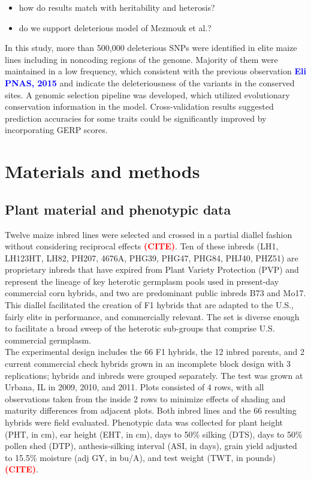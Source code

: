 \documentclass[10pt]{article}
\newcommand{\sme}[1]{\textcolor{red}{\bf #1}}
\newcommand{\yang}[1]{\textcolor{blue}{\bf #1}}
\begin{document}
\begin{itemize}
  \item how do results match with heritability and heterosis?
  \item do we support deleterious model of Mezmouk et al.?
\end{itemize}

In this study, more than 500,000 deleterious SNPs were identified in elite maize lines including in noncoding regions of the genome. Majority of them were maintained in a low frequency, which consistent with the previous observation \yang{Eli PNAS, 2015} and indicate the deleteriousness of the variants in the conserved sites. A genomic selection pipeline was developed, which utilized evolutionary conservation information in the model.
Cross-validation results suggested prediction accuracies for some traits could be significantly improved by incorporating GERP scores. 



\section*{Materials and methods}

\subsection*{Plant material and phenotypic data}
Twelve maize inbred lines were selected and crossed in a partial diallel fashion without considering reciprocal effects \sme{(CITE)}. Ten of these inbreds (LH1, LH123HT, LH82, PH207, 4676A, PHG39, PHG47, PHG84, PHJ40, PHZ51) are proprietary inbreds that have expired from Plant Variety Protection (PVP) and represent the lineage of key heterotic germplasm pools used in present-day commercial corn hybrids, and two are predominant public inbreds B73 and Mo17. This diallel facilitated the creation of F1 hybrids that are adapted to the U.S., fairly elite in performance, and commercially relevant. The set is diverse enough to facilitate a broad sweep of the heterotic sub-groups that comprise U.S. commercial germplasm. \\

The experimental design includes the 66 F1 hybrids, the 12 inbred parents, and 2 current commercial check hybrids grown in an incomplete block design with 3 replications; hybrids and inbreds were grouped separately. The test was grown at Urbana, IL in 2009, 2010, and 2011.  Plots consisted of 4 rows, with all observations taken from the inside 2 rows to minimize effects of shading and maturity differences from adjacent plots. Both inbred lines and the 66 resulting hybrids were field evaluated. Phenotypic data was collected for plant height (PHT, in cm), ear height (EHT, in cm), days to 50\% silking (DTS), days to 50\% pollen shed (DTP), anthesis-silking interval (ASI, in days), grain yield adjusted to 15.5\% moisture (adj GY, in bu/A), and test weight (TWT, in pounds) \sme{(CITE)}.%
\end{document}
